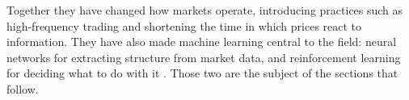 Together they have changed how markets operate, introducing practices such as high-frequency trading and shortening the time in which prices react to information. They have also made machine learning central to the field: neural networks for extracting structure from market data, and reinforcement learning for deciding what to do with it \cite{jansen_machine_2020}. Those two are the subject of the sections that follow.